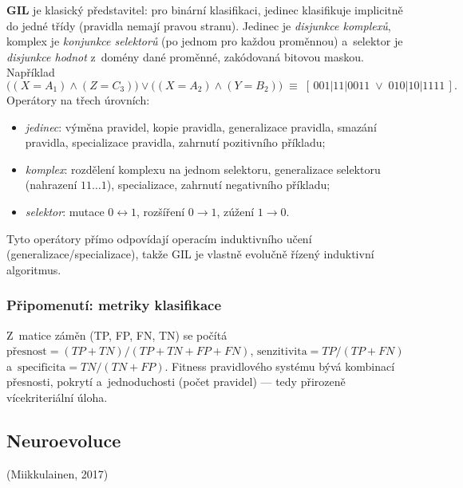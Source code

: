 \documentclass[11pt,a4paper]{article}
\theoremstyle{definition}
\begin{document}
\textbf{GIL} je klasický představitel: pro binární klasifikaci, jedinec
klasifikuje implicitně do jedné třídy (pravidla nemají pravou stranu).
Jedinec je \emph{disjunkce komplexů}, komplex je \emph{konjunkce selektorů}
(po jednom pro každou proměnnou) a~selektor je \emph{disjunkce hodnot}
z~domény dané proměnné, zakódovaná bitovou maskou. Například
\[
\big((X{=}A_1) \wedge (Z{=}C_3)\big) \vee \big((X{=}A_2) \wedge (Y{=}B_2)\big)
\;\equiv\;
[\,001|11|0011 \;\vee\; 010|10|1111\,].
\]
Operátory na třech úrovních:
\begin{itemize}
\item \emph{jedinec}: výměna pravidel, kopie pravidla, generalizace pravidla,
  smazání pravidla, specializace pravidla, zahrnutí pozitivního příkladu;
\item \emph{komplex}: rozdělení komplexu na jednom selektoru, generalizace
  selektoru (nahrazení $11\ldots1$), specializace, zahrnutí negativního
  příkladu;
\item \emph{selektor}: mutace $0 \leftrightarrow 1$, rozšíření $0 \to 1$,
  zúžení $1 \to 0$.
\end{itemize}
Tyto operátory přímo odpovídají operacím induktivního učení
(generalizace/specializace), takže GIL je vlastně evolučně řízený
induktivní algoritmus.

\subsubsection{Připomenutí: metriky klasifikace}

Z~matice záměn (TP, FP, FN, TN) se počítá
$\text{přesnost} = (TP+TN)/(TP+TN+FP+FN)$,
$\text{senzitivita} = TP/(TP+FN)$ a~$\text{specificita} = TN/(TN+FP)$.
Fitness pravidlového systému bývá kombinací přesnosti, pokrytí a~jednoduchosti
(počet pravidel) --- tedy přirozeně vícekriteriální úloha.

\subsection{Neuroevoluce}
\label{sec:neuro}

\begin{defbox}
 (Miikkulainen, 2017)
\end{defbox}
\end{document}
